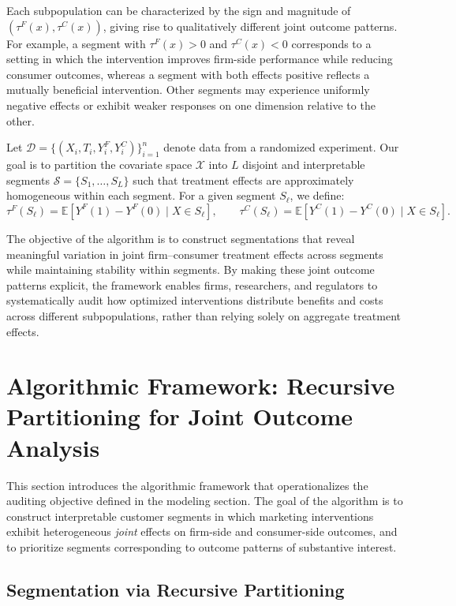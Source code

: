 \documentclass[11pt,letterpaper,english]{article}
\theoremstyle{definition}
\theoremstyle{definition}
\begin{document}
\begin{bibunit}
Each subpopulation can be characterized by the sign and magnitude of $(\tau^F(x), \tau^C(x))$, giving rise to qualitatively different joint outcome patterns. For example, a segment with $\tau^F(x) > 0$ and $\tau^C(x) < 0$ corresponds to a setting in which the intervention improves firm-side performance while reducing consumer outcomes, whereas a segment with both effects positive reflects a mutually beneficial intervention. Other segments may experience uniformly negative effects or exhibit weaker responses on one dimension relative to the other.

Let $\mathcal{D} = \{(X_i, T_i, Y_i^F, Y_i^C)\}_{i=1}^n$ denote data from a randomized experiment. Our goal is to partition the covariate space $\mathcal{X}$ into $L$ disjoint and interpretable segments $\mathcal{S} = \{S_1, \dots, S_L\}$ such that treatment effects are approximately homogeneous within each segment. For a given segment $S_\ell$, we define:
\[
\tau^F(S_\ell) = \mathbb{E}[Y^F(1) - Y^F(0) \mid X \in S_\ell], \qquad
\tau^C(S_\ell) = \mathbb{E}[Y^C(1) - Y^C(0) \mid X \in S_\ell].
\]

The objective of the algorithm is to construct segmentations that reveal meaningful variation in joint firm--consumer treatment effects across segments while maintaining stability within segments. By making these joint outcome patterns explicit, the framework enables firms, researchers, and regulators to systematically audit how optimized interventions distribute benefits and costs across different subpopulations, rather than relying solely on aggregate treatment effects.


\section{Algorithmic Framework: Recursive Partitioning for Joint Outcome Analysis}

This section introduces the algorithmic framework that operationalizes the auditing objective defined in the modeling section. The goal of the algorithm is to construct interpretable customer segments in which marketing interventions exhibit heterogeneous \emph{joint} effects on firm-side and consumer-side outcomes, and to prioritize segments corresponding to outcome patterns of substantive interest.

\subsection{Segmentation via Recursive Partitioning}
\label{ssec:recur_part}


\end{bibunit}
\end{document}
